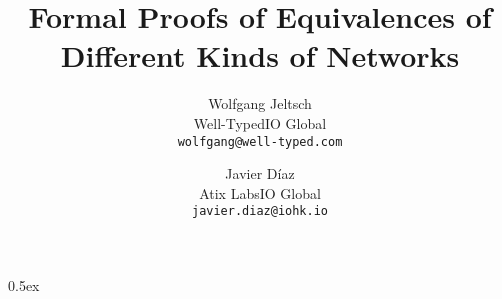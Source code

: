 \documentclass[a4paper,11pt]{article}
\newcommand{\authorinfo}[3]
    {#1\medskip\\\small#2\smallskip\\\small\texttt{#3}}
\newcommand{\andalso}
    {\quad\enspace}
\begin{document}
\title{Formal Proofs of Equivalences of Different Kinds of Networks}
\author{%
    \authorinfo
        {Wolfgang Jeltsch}
        {Well-Typed\andalso IO Global}
        {wolfgang@well-typed.com}%
    \and
    \authorinfo
        {Javier Díaz}
        {Atix Labs\andalso IO Global}
        {javier.diaz@iohk.io}%
}

\maketitle

\tableofcontents

\parindent 0pt\parskip 0.5ex


\end{document}
